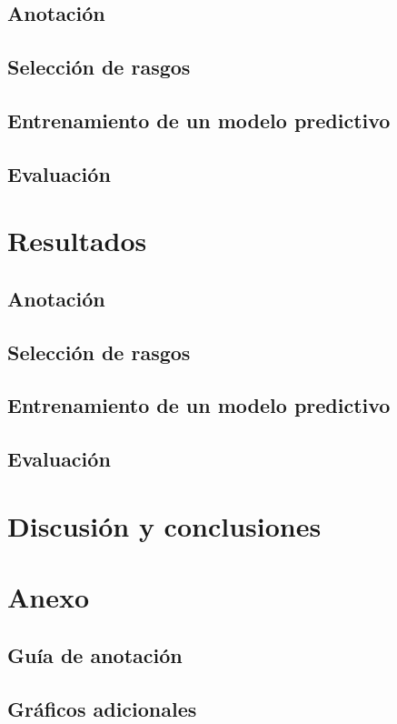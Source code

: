 \documentclass[colorinlistoftodos]{article}
\begin{document}
\subsection{Anotación}

\subsection{Selección de rasgos}

\subsection{Entrenamiento de un modelo predictivo}
%
\subsection{Evaluaci\'on}


\section{Resultados}
\subsection{Anotación}\label{subsec-results-annotation}

\subsection{Selección de rasgos}

\subsection{Entrenamiento de un modelo predictivo}
%
\subsection{Evaluaci\'on}


\section{Discusi\'on y conclusiones}




\clearpage
\appendix
\section{Anexo}
\subsection{Guía de anotación}\label{appendix-annotation}

\subsection{Gráficos adicionales}\label{appendix-plots}


\listoftodos%
\end{document}
